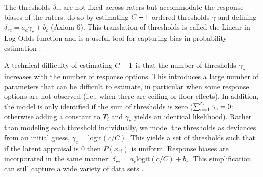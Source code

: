 \documentclass{article}
\newcommand{\Irater}{r}
\newcommand{\Iitem}{i}
\newcommand{\Incat}{c}
\newcommand{\Tncat}{\expandafter\MakeUppercase\expandafter{\Incat}}
\newcommand{\logit}[1]{\text{logit}\left(#1\right)}
\begin{document}
The thresholds $\delta_{\Irater\Incat}$ are not fixed across raters but accommodate the response biases of the raters.  do so by estimating $\Tncat-1$ ordered thresholds $\gamma$ and defining $\delta_{\Irater\Incat} = a_\Incat \gamma_\Incat + b_\Incat$ (Axiom 6). This translation of thresholds is called the Linear in Log Odds function and is a useful tool for capturing bias in probability estimation \cite{Fox1995, Gonzalez1999, Anders2015cultural}.

A technical difficulty of estimating $\Tncat-1$ is that the number of thresholds $\gamma_\Incat$ increases with the number of response options. This introduces a large number of parameters that can be difficult to estimate, in particular when some response options are not observed (i.e., when there are ceiling or floor effects). In addition, the model is only identified if the sum of thresholds is zero ($\sum_{\Incat=1}^{\Tncat}\gamma_\Incat = 0$; otherwise adding a constant to $T_\Iitem$ and $\gamma_\Incat$ yields an identical likelihood). Rather than modeling each threshold individually, we model the thresholds as deviances from an initial guess, $\gamma_\Incat = \logit{c/C}$. This yields a set of thresholds such that if the latent appraisal is 0 then $P(x_{\Irater\Iitem})$ is uniform. Response biases are incorporated in the same manner: $\delta_{\Irater\Incat} = a_\Irater\logit{c/C} + b_\Irater$. This simplification can still capture a wide variety of data sets \cite{Selker2019}.
\end{document}
